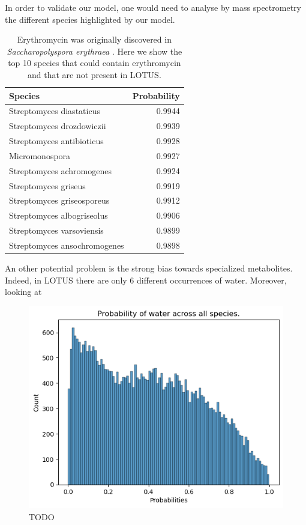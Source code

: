 \documentclass[
11pt, %
oneside, %
english, %
singlespacing, %
headsepline, %
chapterinoneline, %
]{MastersDoctoralThesis} %
\begin{document}
In order to validate our model, one would need to analyse by mass spectrometry the different species highlighted by our model. 


\begin{table}[h]
	\centering
	\caption{Erythromycin was originally discovered in \textit{Saccharopolyspora erythraea } \cite{beranIsolationErythromycinNoxide1991}. Here we show the top 10 species that could contain erythromycin and that are not present in LOTUS.}
	\begin{tabular}{lr}
		\toprule
		Species & Probability \\
		\midrule
		Streptomyces diastaticus & 0.9944 \\
		Streptomyces drozdowiczii & 0.9939 \\
		Streptomyces antibioticus & 0.9928 \\
		Micromonospora & 0.9927 \\
		Streptomyces achromogenes & 0.9924 \\
		Streptomyces griseus & 0.9919 \\
		Streptomyces griseosporeus & 0.9912 \\
		Streptomyces albogriseolus & 0.9906 \\
		Streptomyces varsoviensis & 0.9899 \\
		Streptomyces ansochromogenes & 0.9898 \\
		\bottomrule
	\end{tabular}
	\label{table: Erythromycin top scores}
\end{table}

An other potential problem is the strong bias towards specialized metabolites. Indeed, in LOTUS there are only 6 different occurrences of water. Moreover, looking at 

\begin{figure}
	\centering
	\includegraphics[scale=0.7]{figure/water}
	\caption{TODO}
	\label{fig: water probabilites}
\end{figure}
\end{document}
